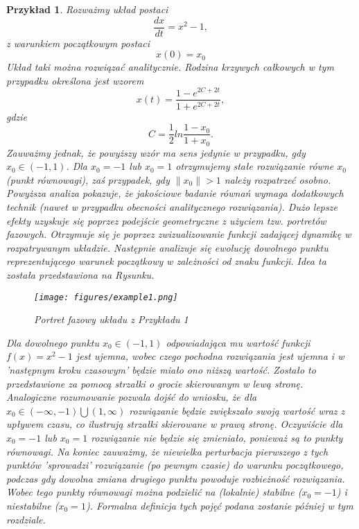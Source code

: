 \documentclass[12pt]{article}
\newtheorem{przyklad}{Przykład}
\begin{document}
\begin{przyklad}\label{przyklad1}
	Rozważmy układ postaci
	\begin{equation}
	\frac{dx}{dt} = x^2-1,
	\end{equation}
	z warunkiem początkowym postaci
	\begin{equation}
	x(0) = x_{0}
	\end{equation}
	Układ taki można rozwiązać analitycznie. Rodzina krzywych całkowych w tym przypadku określona jest wzorem
	\begin{equation}
	x(t) = \frac{1 - e^{2C + 2t}}{1 + e^{2C + 2t}},
	\end{equation}
	gdzie
	\begin{equation}
	C = \frac{1}{2}ln\frac{1-x_{0}}{1+x_{0}}.
	\end{equation}	
	Zauważmy jednak, że powyższy wzór ma sens jedynie w przypadku, gdy $ x_{0} \in (-1,1) $. Dla $ x_{0} = -1 $ lub $ x_{0} = 1 $ otrzymujemy stałe rozwiązanie równe $ x_{0} $ (punkt równowagi), zaś przypadek, gdy $ \| {x_{0}}\| > 1 $ należy rozpatrzeć osobno.\newline 
	Powyższa analiza pokazuje, że jakościowe badanie równań wymaga dodatkowych technik (nawet w przypadku obecności analitycznego rozwiązania). Dużo lepsze efekty uzyskuje się poprzez podejście geometryczne z użyciem tzw. \textit{portretów fazowych}. Otrzymuje się je poprzez zwizualizowanie funkcji zadającej dynamikę w rozpatrywanym układzie. Następnie analizuje się ewolucję dowolnego punktu reprezentującego warunek początkowy w zależności od znaku funkcji. Idea ta została przedstawiona na Rysunku.
	\begin{figure}[H]
		\texttt{[image: figures/example1.png]} 
		\centering
		\caption{Portret fazowy układu z Przykładu 1}
	\end{figure}
	Dla dowolnego punktu $ x_{0} \in (-1,1) $ odpowiadająca mu wartość funkcji $ f(x) = x^2-1 $ jest ujemna, wobec czego pochodna rozwiązania jest ujemna i w 'następnym kroku czasowym' będzie miało ono niższą wartość. Zostało to przedstawione za pomocą strzałki o grocie skierowanym w lewą stronę. Analogiczne rozumowanie pozwala dojść do wniosku, że dla $ x_{0} \in (-\infty,-1) \bigcup (1,\infty)$ rozwiązanie będzie zwiększało swoją wartość wraz z upływem czasu, co ilustrują strzałki skierowane w prawą stronę. Oczywiście dla  $ x_{0} = -1 $ lub $ x_{0} = 1 $ rozwiązanie nie będzie się zmieniało, ponieważ są to punkty równowagi. Na koniec zauważmy, że niewielka perturbacja pierwszego z tych punktów 'sprowadzi' rozwiązanie (po pewnym czasie) do warunku początkowego, podczas gdy dowolna zmiana drugiego punktu powoduje rozbieżność rozwiązania. Wobec tego punkty równowagi można podzielić na (lokalnie) stabilne ($ x_{0} = -1 $) i niestabilne ($ x_{0} = 1 $). Formalna definicja tych pojęć podana zostanie później w tym rozdziale.
\end{przyklad}
\end{document}
